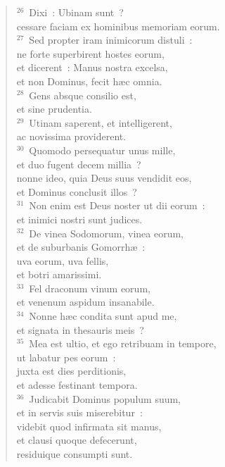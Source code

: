 \begin{flushleft}\begin{verse}${}^{26}$~Dixi~: Ubinam sunt~?\\ cessare faciam ex hominibus memoriam eorum.\\
${}^{27}$~Sed propter iram inimicorum distuli~:\\ ne forte superbirent hostes eorum,\\ et dicerent~: Manus nostra excelsa,\\ et non Dominus, fecit h\ae c omnia.\\
${}^{28}$~Gens absque consilio est,\\ et sine prudentia.\\
${}^{29}$~Utinam saperent, et intelligerent,\\ ac novissima providerent.\\
${}^{30}$~Quomodo persequatur unus mille,\\ et duo fugent decem millia~?\\ nonne ideo, quia Deus suus vendidit eos,\\ et Dominus conclusit illos~?\\
${}^{31}$~Non enim est Deus noster ut dii eorum~:\\ et inimici nostri sunt judices.\\
${}^{32}$~De vinea Sodomorum, vinea eorum,\\ et de suburbanis Gomorrh\ae~:\\ uva eorum, uva fellis,\\ et botri amarissimi.\\
${}^{33}$~Fel draconum vinum eorum,\\ et venenum aspidum insanabile.\\
${}^{34}$~Nonne h\ae c condita sunt apud me,\\ et signata in thesauris meis~?\\
${}^{35}$~Mea est ultio, et ego retribuam in tempore,\\ ut labatur pes eorum~:\\ juxta est dies perditionis,\\ et adesse festinant tempora.\\
${}^{36}$~Judicabit Dominus populum suum,\\ et in servis suis miserebitur~:\\ videbit quod infirmata sit manus,\\ et clausi quoque defecerunt,\\ residuique consumpti sunt.\end{verse}\end{flushleft}


